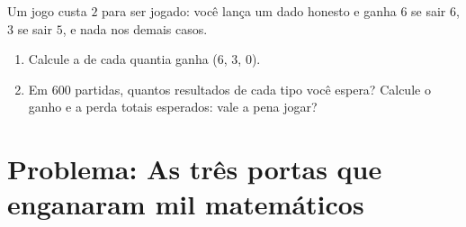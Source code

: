 \begin{exercise}[$\star\star\star$]\label{exo:g10:proba:9}
Um jogo custa $2$ para ser jogado: você lança um dado honesto e ganha $6$
se sair $6$, $3$ se sair $5$, e nada nos demais casos.
\begin{enumerate}
  \item Calcule a  de cada quantia ganha ($6$, $3$, $0$).
  \item Em $600$ partidas, quantos resultados de cada tipo você espera?
        Calcule o ganho e a perda totais esperados: vale a pena jogar?
\end{enumerate}
\end{exercise}

\section{Problema: As três portas que enganaram mil matemáticos}

